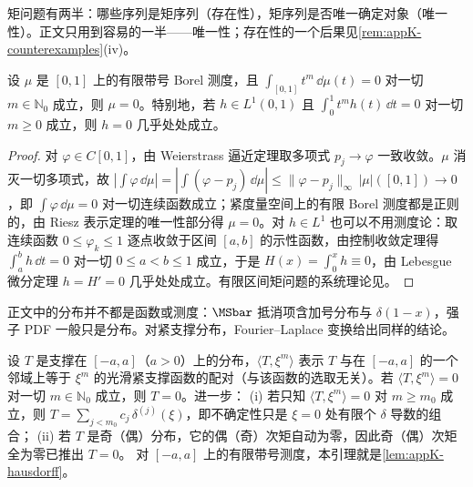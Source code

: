 矩问题有两半：哪些序列是矩序列（存在性），矩序列是否唯一确定对象（唯一性）。正文只用到容易的一半——唯一性；存在性的一个后果见\cref{rem:appK-counterexamples}(iv)。

\begin{lemma}\label{lem:appK-hausdorff}
设 $\mu$ 是 $[0,1]$ 上的有限带号 Borel 测度，且 $\int_{[0,1]}t^m\,\dd\mu(t)=0$ 对一切 $m\in\mathbb N_0$ 成立，则 $\mu=0$。特别地，若 $h\in L^1(0,1)$ 且 $\int_0^1t^mh(t)\,\dd t=0$ 对一切 $m\ge0$ 成立，则 $h=0$ 几乎处处成立。
\end{lemma}

\begin{proof}
对 $\varphi\in C[0,1]$，由 Weierstrass 逼近定理取多项式 $p_j\to\varphi$ 一致收敛。$\mu$ 消灭一切多项式，故
$|\int\varphi\,\dd\mu|=|\int(\varphi-p_j)\,\dd\mu|\le\|\varphi-p_j\|_\infty\,|\mu|([0,1])\to0$，即 $\int\varphi\,\dd\mu=0$ 对一切连续函数成立；紧度量空间上的有限 Borel 测度都是正则的，由 Riesz 表示定理的唯一性部分得 $\mu=0$\cite[第~2、6~章]{Rudin1987}。对 $h\in L^1$ 也可以不用测度论：取连续函数 $0\le\varphi_k\le1$ 逐点收敛于区间 $[a,b]$ 的示性函数，由控制收敛定理得 $\int_a^bh\,\dd t=0$ 对一切 $0\le a<b\le1$ 成立，于是 $H(x)=\int_0^xh\equiv0$，由 Lebesgue 微分定理 $h=H'=0$ 几乎处处成立\cite[第~7~章]{Rudin1987}。有限区间矩问题的系统理论见\cite{Hausdorff1921a,Hausdorff1921b,Hausdorff1923}。
\end{proof}

正文中的分布并不都是函数或测度：$\MSbar$ 抵消项含加号分布与 $\delta(1-x)$，强子 PDF 一般只是分布。对紧支撑分布，Fourier--Laplace 变换给出同样的结论。

\begin{lemma}[紧支撑分布由其矩决定]\label{lem:appK-compact}
设 $T$ 是支撑在 $[-a,a]$（$a>0$）上的分布，$\langle T,\xi^m\rangle$ 表示 $T$ 与在 $[-a,a]$ 的一个邻域上等于 $\xi^m$ 的光滑紧支撑函数的配对（与该函数的选取无关）。若 $\langle T,\xi^m\rangle=0$ 对一切 $m\in\mathbb N_0$ 成立，则 $T=0$。进一步：
(i) 若只知 $\langle T,\xi^m\rangle=0$ 对 $m\ge m_0$ 成立，则 $T=\sum_{j<m_0}c_j\,\delta^{(j)}(\xi)$，即不确定性只是 $\xi=0$ 处有限个 $\delta$ 导数的组合；
(ii) 若 $T$ 是奇（偶）分布，它的偶（奇）次矩自动为零，因此奇（偶）次矩全为零已推出 $T=0$。
对 $[-a,a]$ 上的有限带号测度，本引理就是\cref{lem:appK-hausdorff}。
\end{lemma}


